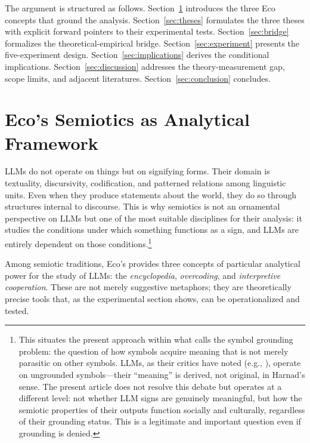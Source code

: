 \documentclass[12pt,a4paper]{article}
\begin{document}
The argument is structured as follows. Section~\ref{sec:framework} introduces
the three Eco concepts that ground the analysis. Section~\ref{sec:theses}
formulates the three theses with explicit forward pointers to their experimental
tests. Section~\ref{sec:bridge} formalizes the theoretical-empirical bridge.
Section~\ref{sec:experiment} presents the five-experiment design.
Section~\ref{sec:implications} derives the conditional implications.
Section~\ref{sec:discussion} addresses the theory-measurement gap, scope
limits, and adjacent literatures. Section~\ref{sec:conclusion} concludes.


\section{Eco's Semiotics as Analytical Framework}
\label{sec:framework}

LLMs do not operate on things but on signifying forms. Their domain is
textuality, discursivity, codification, and patterned relations among linguistic
units. Even when they produce statements about the world, they do so through
structures internal to discourse. This is why semiotics is not an ornamental
perspective on LLMs but one of the most suitable disciplines for their analysis:
it studies the conditions under which something functions as a sign, and LLMs
are entirely dependent on those conditions.\footnote{This situates the present
approach within what \citet{Harnad1990} calls the symbol grounding problem:
the question of how symbols acquire meaning that is not merely parasitic on
other symbols. LLMs, as their critics have noted (e.g., \citealt{Searle1980}),
operate on ungrounded symbols---their ``meaning'' is derived, not original, in
Harnad's sense. The present article does not resolve this debate but operates
at a different level: not whether LLM signs are genuinely meaningful, but how
the semiotic properties of their outputs function socially and culturally,
regardless of their grounding status. This is a legitimate and important
question even if grounding is denied.}

Among semiotic traditions, Eco's provides three concepts of particular
analytical power for the study of LLMs: the \emph{encyclopedia},
\emph{overcoding}, and \emph{interpretive cooperation}. These are not merely
suggestive metaphors; they are theoretically precise tools that, as the
experimental section shows, can be operationalized and tested.
\end{document}
